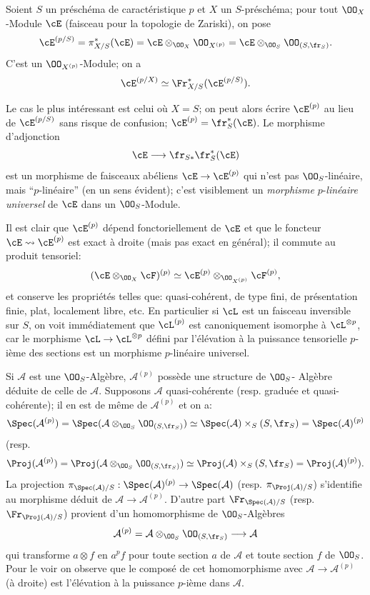 Soient $S$ un préschéma de caractéristique $p$ et $X$ un $S$-préschéma; pour tout $\OO_X$-Module $\cE$ (faisceau pour la topologie de Zariski), on pose
\[
\cE^{(p/S)}=\pi_{X/S}^*(\cE)=\cE\otimes_{\OO_X}\OO_{X^{(p)}}
 =\cE\otimes_{\OO_S}\OO_{(S,\fr_S)}.
\]
C'est un $\OO_{X^{(p)}}$-Module; on a
\[
\cE^{(p/X)}\simeq \Fr_{X/S}^*(\cE^{(p/S)}).
\]

Le cas le plus intéressant est celui où $X=S$; on peut alors écrire $\cE^{(p)}$ au lieu de $\cE^{(p/S)}$ sans risque de confusion; $\cE^{(p)}=\fr_S^*(\cE)$. Le morphisme d'adjonction
\[
\cE\longrightarrow \fr_{S*}\fr_S^*(\cE)
\]
est un morphisme de faisceaux abéliens $\cE\to\cE^{(p)}$ qui n'est pas $\OO_S$-linéaire, mais ``$p$-linéaire'' (en un sens évident); c'est visiblement un \emph{morphisme} $p$-\emph{linéaire universel} de $\cE$ dans un $\OO_S$-Module.

Il est clair que $\cE^{(p)}$ dépend fonctoriellement de $\cE$ et que le foncteur $\cE\rightsquigarrow\cE^{(p)}$ est exact à droite (mais pas exact en général); il commute au produit tensoriel:
\[
(\cE\otimes_{\OO_X}\cF)^{(p)}\simeq
\cE^{(p)}\otimes_{\OO_{X^{(p)}}}\cF^{(p)},
\]
et conserve les propriétés telles que: quasi-cohérent, de type fini, de présentation finie, plat, localement libre, etc. En particulier si $\cL$ est un faisceau inversible sur $S$, on voit immédiatement que $\cL^{(p)}$ est canoniquement isomorphe à $\cL^{\otimes p}$, car le morphisme $\cL\to\cL^{\otimes p}$ défini par l'élévation à la puissance tensorielle $p$-ième des sections est un morphisme $p$-linéaire universel.

Si $\mathcal{A}$ est une $\OO_S$-Algèbre, $\mathcal{A}^{(p)}$ possède une structure de $\OO_S$-
Algèbre déduite de celle de $\mathcal{A}$. Supposons $\mathcal{A}$ quasi-cohérente (resp. graduée et quasi-cohérente); il en est de même de $\mathcal{A}^{(p)}$ et on a:
\[
\Spec(\mathcal{A}^{(p)})=\Spec(\mathcal{A}\otimes_{\OO_S}\OO_{(S,\fr_S)})
 \simeq \Spec(\mathcal{A})\times_S(S,\fr_S)=\Spec(\mathcal{A})^{(p)}
\]
(resp.
\[
\Proj(\mathcal{A}^{(p)})=\Proj(\mathcal{A}\otimes_{\OO_S}\OO_{(S,\fr_S)})
 \simeq \Proj(\mathcal{A})\times_S(S,\fr_S)=\Proj(\mathcal{A})^{(p)}).
\]
La projection $\pi_{\Spec(\mathcal{A})/S}:\Spec(\mathcal{A})^{(p)}\to\Spec(\mathcal{A})$ (resp. $\pi_{\Proj(\mathcal{A})/S}$) s'identifie au morphisme déduit de $\mathcal{A}\to\mathcal{A}^{(p)}$. D'autre part $\Fr_{\Spec(\mathcal{A})/S}$ (resp. $\Fr_{\Proj(\mathcal{A})/S}$) provient d'un homomorphisme de $\OO_S$-Algèbres
\[
\mathcal{A}^{(p)}=\mathcal{A}\otimes_{\OO_S}\OO_{(S,\fr_S)}\longrightarrow \mathcal{A}
\]
qui transforme $a\otimes f$ en $a^p f$ pour toute section $a$ de $\mathcal{A}$ et toute section $f$ de $\OO_S$. Pour le voir on observe que le composé de cet homomorphisme avec $\mathcal{A}\to\mathcal{A}^{(p)}$ (à droite) est l'élévation à la puissance $p$-ième dans $\mathcal{A}$.

